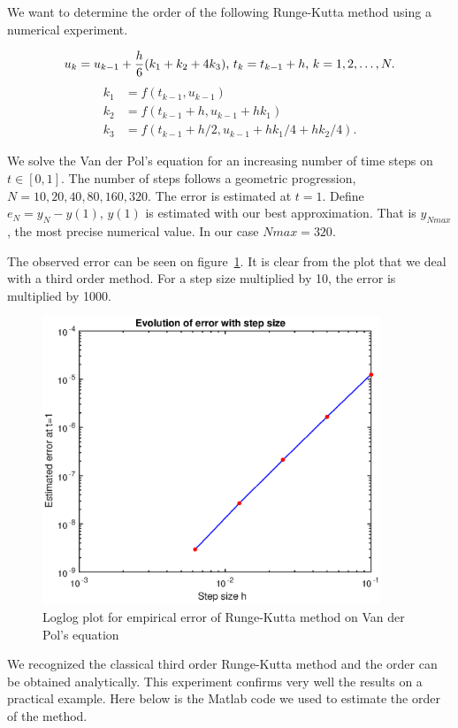 
We want to determine the order of the following Runge-Kutta method using a numerical experiment. 

$$u_k = u_{k-1} + \dfrac{h}{6}(k_1 + k_2 + 4k_3 )\text{,   } t_k = t_{k-1}+h\text{,   } k=1,2,\dots,N.$$
\begin{align*}
k_1 &= f(t_{k-1},u_{k-1})\\
k_2 &= f(t_{k-1}+h,u_{k-1}+hk_{1})\\
k_3 &= f(t_{k-1}+h/2,u_{k-1}+hk_{1}/4+hk_{2}/4).
\end{align*}

 We solve the Van der Pol's equation for an increasing number of time steps on $t\in[0,1]$. The number of steps follows a geometric progression, $N=10,20,40,80,160,320$. The error is estimated at $t=1$. Define $e_N = y_N -y(1)$, $y(1)$ is estimated with our best approximation. That is $y_{Nmax}$, the most precise numerical value. In our case $Nmax = 320$.

The observed error can be seen on figure~\ref{fig:a1}. It is clear from the plot that we deal with a third order method. For a step size multiplied by 10, the error is multiplied by 1000.


\begin{figure}[!h]
\centering
\includegraphics[width = 0.9\textwidth]{./a1.eps}
\caption{Loglog plot for empirical error of Runge-Kutta method on Van der Pol's equation}
\label{fig:a1}
\end{figure}
\FloatBarrier
We recognized the classical third order Runge-Kutta method and the order can be obtained analytically. This experiment confirms very well the results on a practical example. Here below is the Matlab code we used to estimate the order of the method.



